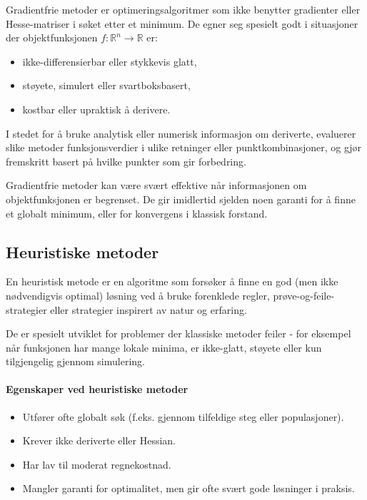 Gradientfrie metoder er optimeringsalgoritmer som ikke benytter gradienter eller Hesse-matriser i søket etter et minimum.
De egner seg spesielt godt i situasjoner der objektfunksjonen \( f : \mathbb{R}^n \to \mathbb{R} \) er:
\begin{itemize}
	\item ikke-differensierbar eller stykkevis glatt,
	\item støyete, simulert eller svartboksbasert,
	\item kostbar eller upraktisk å derivere.
\end{itemize}

I stedet for å bruke analytisk eller numerisk informasjon om deriverte, evaluerer slike metoder funksjonsverdier i ulike retninger eller punktkombinasjoner, og gjør fremskritt basert på hvilke punkter som gir forbedring.

Gradientfrie metoder kan være svært effektive når informasjonen om objektfunksjonen er begrenset. De gir imidlertid sjelden noen garanti for å finne et globalt minimum, eller for konvergens i klassisk forstand.

\subsection{Heuristiske metoder}

En heuristisk metode er en algoritme som forsøker å finne en god (men ikke nødvendigvis optimal) løsning ved å bruke forenklede regler, prøve-og-feile-strategier eller strategier inspirert av natur og erfaring.

De er spesielt utviklet for problemer der klassiske metoder feiler - for eksempel når funksjonen har mange lokale minima, er ikke-glatt, støyete eller kun tilgjengelig gjennom simulering.

\paragraph{Egenskaper ved heuristiske metoder}

\begin{itemize}
	\item Utfører ofte globalt søk (f.eks. gjennom tilfeldige steg eller populasjoner).
	\item Krever ikke deriverte eller Hessian.
	\item Har lav til moderat regnekostnad.
	\item Mangler garanti for optimalitet, men gir ofte svært gode løsninger i praksis.
\end{itemize}

